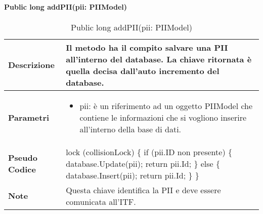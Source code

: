 \paragraph{Public long addPII(pii: PIIModel)}
\begin{center}
    \begin{longtable}{|p{3cm}|p{9cm}|}%
    \caption{Public long addPII(pii: PIIModel)}
    \label{tab:public-long-addPII}
    \endfirsthead
    \endhead
    \hline
    \textbf{Descrizione} & Il metodo ha il compito salvare una PII all’interno del database. La chiave ritornata è quella decisa dall’auto incremento del database. \\
    \hline
    \textbf{Parametri} &      
    \begin{itemize}
        \item pii: è un riferimento ad un oggetto PIIModel che contiene le informazioni che si vogliono inserire all’interno della base di dati.
    \end{itemize}
    \\
    \hline
    \textbf{Pseudo Codice} & 
    lock (collisionLock)\newline
    \{\newline
        if (pii.ID non presente)\newline
        \{\newline
            database.Update(pii);\newline
            return pii.Id;\newline
        \}\newline
        else\newline
        \{\newline
            database.Insert(pii);\newline
            return pii.Id;\newline
        \} \newline
    \}\newline
    \\
    \hline
    \textbf{Note} & 
    Questa chiave identifica la PII e deve essere comunicata all’ITF.
    \\
    \hline
    \end{longtable}
    \end{center}







